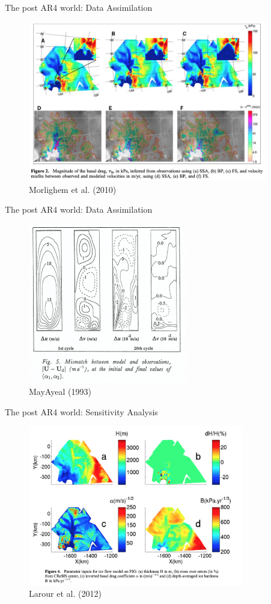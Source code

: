 \documentclass[hide notes,intlimits]{beamer}
\begin{document}
\begin{frame}{The post AR4 world: Data Assimilation}
    \begin{figure}
      \includegraphics[height=7cm]{morlighem_2010_fig_2}
      \\ \tiny{Morlighem et al. (2010)}
    \end{figure}
\end{frame}

\begin{frame}{The post AR4 world: Data Assimilation}
    \begin{figure}
      \includegraphics[height=7cm]{macayeal_1993_fig_5}
      \\ \tiny{MayAyeal (1993)}
    \end{figure}
\end{frame}

\begin{frame}{The post AR4 world: Sensitivity Analysis}
    \begin{figure}
      \includegraphics[height=7cm]{larour_2012_fig_4}
      \\ \tiny{Larour et al. (2012)}
    \end{figure}
\end{frame}
\end{document}
